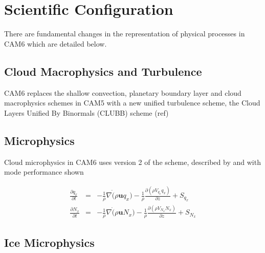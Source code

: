 \section{Scientific Configuration}
There are fundamental changes in the representation of physical processes in CAM6 which are detailed below. 


\subsection{Cloud Macrophysics and Turbulence}

CAM6 replaces the shallow convection, planetary boundary layer and cloud macrophysics schemes in CAM5 with a new unified turbulence scheme, the Cloud Layers Unified By Binormals (CLUBB) scheme (ref)



\subsection{Microphysics}

Cloud microphysics in CAM6 uses version 2 of the \cite{Morrison08} scheme, described by \cite{gettelman15} and with mode performance shown \cite{gettelman15a}

\begin{eqnarray}
  \frac{\partial q_x}{\partial t} & = & -\frac{1}{\rho}\nabla\dot(\rho \mathbf{u} q_x) - \frac{1}{\rho}\frac{\partial(\rho V_{q_x}q_x)}{\partial z}+S_{q_x}  \\
  \frac{\partial N_x}{\partial t} & = & -\frac{1}{\rho}\nabla\dot(\rho \mathbf{u} N_x) - \frac{1}{\rho}\frac{\partial(\rho V_{N_x}N_x)}{\partial z}+S_{N_x}
\end{eqnarray}

\subsection{Ice Microphysics}


